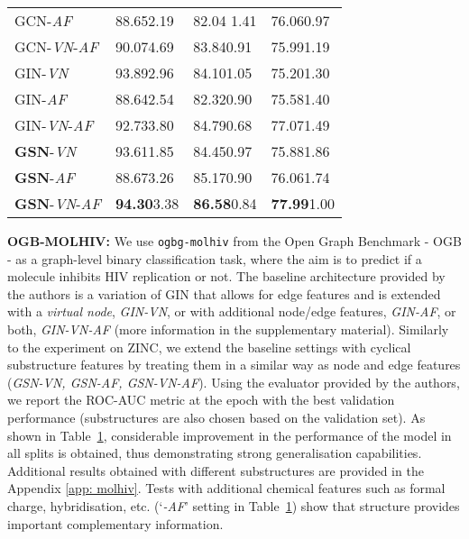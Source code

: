 \documentclass{article} \usepackage{iclr2021_conference,times}
\begin{document}
\begin{table}[t!]
\begin{minipage}[t]{0.58\linewidth}
{\begin{tabular}{l|lll}
        GCN-\textit{AF}&
        88.652.19 & 
        82.04 1.41 & 
        76.060.97\\
        
        GCN-\textit{VN}-{\em AF} &
        90.074.69 &
        83.840.91 &
        75.991.19\\
        \hline
        
        GIN-\textit{VN} &
        93.892.96 & 
        84.101.05  & 
        75.201.30\\
        
        GIN-\textit{AF} &
        88.642.54 & 
        82.320.90 & 
        75.581.40\\
        
        GIN-\textit{VN}-{\em AF} &
        92.733.80 & 
        84.790.68 & 
        77.071.49\\
        \hline
        
        
        {\bf GSN}-\textit{VN} & 
        93.611.85 &
        84.450.97 &
        75.881.86 \\
        
        {\bf GSN}-\textit{AF} & 
        88.673.26 &
        85.170.90 &
        76.061.74\\
        
        {\bf GSN}-\textit{VN}-{\em AF}&
         \textbf{94.30}3.38&
         \textbf{86.58}0.84&
        \textbf{77.99}1.00\\


      \end{tabular}
      }\label{tab:molhiv_dataset}
     \centering 
    \end{minipage}
\end{table}


\noindent\textbf{OGB-MOLHIV:} 
We use \texttt{ogbg-molhiv} from the Open Graph Benchmark - OGB - \citep{DBLP:ogb} as a 
graph-level binary classification task, where the aim is to predict if a molecule inhibits HIV replication or not. The baseline architecture provided by the authors is a variation of GIN that allows for edge features and is extended with a \textit{virtual node}, \textit{GIN-VN}, or with additional node/edge features, \textit{GIN-AF}, or both, \textit{GIN-VN-AF} (more information in the supplementary material). Similarly to the experiment on ZINC, we extend the baseline settings with cyclical substructure features by treating them in a similar way as node and edge features (\textit{GSN-VN, GSN-AF, GSN-VN-AF}). Using the evaluator provided by the authors, we report the ROC-AUC metric at the epoch with the best validation performance (substructures are also chosen based on the validation set).  As shown in Table~\ref{tab:molhiv_dataset}, considerable improvement in the performance of the model in all splits is obtained, thus demonstrating strong generalisation capabilities. Additional results obtained with different substructures are provided in the Appendix \ref{app: molhiv}. Tests with additional chemical features such as formal charge, hybridisation, etc. (`\textit{-AF}' setting in Table~\ref{tab:molhiv_dataset}) show that structure provides important  complementary information. 
\end{document}

